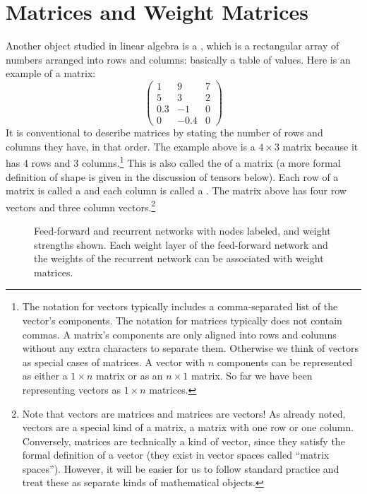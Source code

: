 
\section{Matrices and Weight Matrices}\label{weightMatrices}

   Another object studied in linear algebra is a , which is a 
rectangular array of numbers arranged into rows and columns: basically a table of 
values. Here is an example of a matrix:
\[
\begin{pmatrix}
 1  &   9  & 7 \\
 5  &   3  & 2 \\
0.3 &  -1  & 0 \\
 0  & -0.4 & 0
\end{pmatrix}
\]
It is conventional to describe matrices by stating the number of rows and 
columns they have, in that order. The example above is a $4 \times 3$ 
matrix because it has 4 rows and 3 columns.\footnote{The notation for vectors typically includes a comma-separated list of the vector's components. The notation for matrices typically does not contain commas. A  matrix's components are only aligned into rows and columns without any extra characters to separate them. Otherwise we think of vectors as special cases of matrices. A vector with $n$ components can be represented as either a $1 \times n$ matrix or as an $n \times 1$ matrix. So far we have been representing vectors as $1 \times n$ matrices.} This is also called the  of a matrix (a more formal definition of shape is given in the discussion of tensors below). Each row of a matrix is called a  and each column is called a . The matrix above has four row vectors and
three column vectors.\footnote{Note that vectors  are matrices and matrices are vectors!  As already noted, vectors are a special kind of a matrix, 
a matrix with one row or one column. Conversely, matrices are technically a 
kind of vector, since they satisfy the formal definition of a vector (they 
exist in vector spaces called ``matrix spaces''). However, it will be easier for us to follow standard practice and treat these as separate kinds of mathematical objects.}  

\begin{figure}[h]
\centering
{}
\hspace*{.7in}
\caption[Simbrain screenshots modified by Jeff Yoshimi.]{Feed-forward and recurrent networks with nodes labeled, and weight strengths shown. Each weight layer of the feed-forward network and the weights of the recurrent network can be associated with weight matrices. }
\label{labelledNets}
\end{figure}

